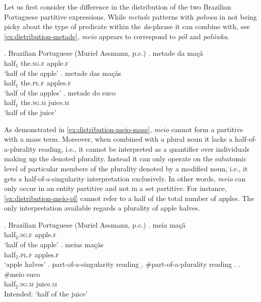 Let us first consider the difference in the distribution of the two Brazilian Portuguese partitive expressions. While \textit{metade} patterns with \textit{połowa} in not being picky about the type of predicate within the \textit{da}-phrase it can combine with, see \ref{ex:distribution-metade}, \textit{meio} appears to correspond to \textit{pół} and \textit{połówka}. 

\ex. Brazilian Portuguese (Muriel Assmann, p.c.)\label{ex:distribution-metade}
\ag. metade da ma{\c{c}}{\~{a}}\label{ex:distribution-metade-sg}\\
half$_1$ the\textsc{.sg.f} apple\textsc{.f}\\
`half of the apple'
\bg. metade das ma{\c{c}}{\~{a}}s\label{ex:distribution-metade-pl}\\
half$_1$ the\textsc{.pl.f} apples\textsc{.f}\\
`half of the apples'
\bg. metade do suco\label{ex:distribution-metade-mass}\\
half$_1$ the\textsc{.sg.m} juice\textsc{.m}\\
`half of the juice'

As demonstrated in \ref{ex:distribution-meio-mass}, \textit{meio} cannot form a partitive with a mass term. Moreover, when combined with a plural noun it lacks a half-of-a-plurality reading, i.e., it cannot be interpreted as a quantifier over individuals making up the denoted plurality. Instead it can only operate on the subatomic level of particular members of the plurality denoted by a modified noun, i.e., it gets a half-of-a-singularity interpretation exclusively. In other words, \textit{meio} can only occur in an entity partitive and not in a set partitive. For instance, \ref{ex:distribution-meio-pl} cannot refer to a half of the total number of apples. The only interpretation available regards a plurality of apple halves.\largerpage

\ex. Brazilian Portuguese (Muriel Assmann, p.c.)\label{ex:distribution-meio}
\ag. meia ma{\c{c}}{\~{a}}\label{ex:distribution-meio-sg}\\
half$_{2}$\textsc{.sg.f} apple\textsc{.f}\\
`half of the apple'
\bg. meias ma{\c{c}}{\~{a}}s\label{ex:distribution-meio-pl}\\
half$_{2}$\textsc{.pl.f} apples\textsc{.f}\\
`apple halves'
\a. part-of-a-singularity reading
\b. \#part-of-a-plurality reading
\z. 
\bg. \#meio suco\label{ex:distribution-meio-mass}\\
half$_{2}$\textsc{.sg.m} juice\textsc{.m}\\
Intended: `half of the juice'

